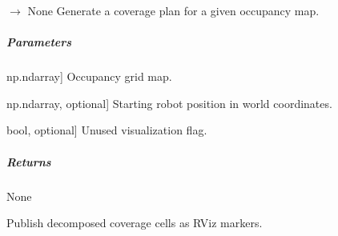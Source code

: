 \documentclass[letterpaper,10pt,english]{sphinxmanual}
\begin{document}
\begin{fulllineitems}
\begin{fulllineitems}
\label{\detokenize{mirte_lc_nav2.navigator_types:mirte_lc_nav2.navigator_types.SystematicNavigator.pixel_to_world_poly}}
\pysigstartsignatures
\pysiglinewithargsret
{}
{}
{}
\pysigstopsignatures
\end{fulllineitems}


\begin{fulllineitems}
\label{\detokenize{mirte_lc_nav2.navigator_types:mirte_lc_nav2.navigator_types.SystematicNavigator.plan}}
\pysigstartsignatures
\pysiglinewithargsret
{}
{\sphinxparamcomma {}\sphinxparamcomma {}}
{{ $\rightarrow$ None}}
\pysigstopsignatures
\sphinxAtStartPar
Generate a coverage plan for a given occupancy map.


\subparagraph{Parameters}
\label{\detokenize{mirte_lc_nav2.navigator_types:id3}}\begin{description}
\sphinxlineitem{new\_map}{[}np.ndarray{]}
\sphinxAtStartPar
Occupancy grid map.

\sphinxlineitem{start}{[}np.ndarray, optional{]}
\sphinxAtStartPar
Starting robot position in world coordinates.

\sphinxlineitem{show}{[}bool, optional{]}
\sphinxAtStartPar
Unused visualization flag.

\end{description}


\subparagraph{Returns}
\label{\detokenize{mirte_lc_nav2.navigator_types:id4}}
\sphinxAtStartPar
None

\end{fulllineitems}


\begin{fulllineitems}
\label{\detokenize{mirte_lc_nav2.navigator_types:mirte_lc_nav2.navigator_types.SystematicNavigator.publish_decomposition}}
\pysigstartsignatures
\pysiglinewithargsret
{}
{}
{}
\pysigstopsignatures
\sphinxAtStartPar
Publish decomposed coverage cells as RViz markers.


\end{fulllineitems}
\end{fulllineitems}
\end{document}
